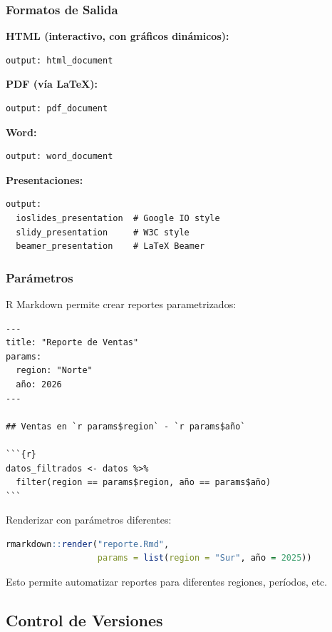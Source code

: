 \documentclass[11pt,a4paper]{article}
\begin{document}
\subsubsection{Formatos de Salida}

\textbf{HTML (interactivo, con gráficos dinámicos):}
\begin{lstlisting}
output: html_document
\end{lstlisting}

\textbf{PDF (vía LaTeX):}
\begin{lstlisting}
output: pdf_document
\end{lstlisting}

\textbf{Word:}
\begin{lstlisting}
output: word_document
\end{lstlisting}

\textbf{Presentaciones:}
\begin{lstlisting}
output: 
  ioslides_presentation  # Google IO style
  slidy_presentation     # W3C style
  beamer_presentation    # LaTeX Beamer
\end{lstlisting}

\subsubsection{Parámetros}

R Markdown permite crear reportes parametrizados:

\begin{lstlisting}
---
title: "Reporte de Ventas"
params:
  region: "Norte"
  año: 2026
---

## Ventas en `r params$region` - `r params$año`

```{r}
datos_filtrados <- datos %>%
  filter(region == params$region, año == params$año)
```
\end{lstlisting}

Renderizar con parámetros diferentes:
\begin{lstlisting}[language=R]
rmarkdown::render("reporte.Rmd", 
                  params = list(region = "Sur", año = 2025))
\end{lstlisting}

Esto permite automatizar reportes para diferentes regiones, períodos, etc.

\subsection{Control de Versiones}
\end{document}
